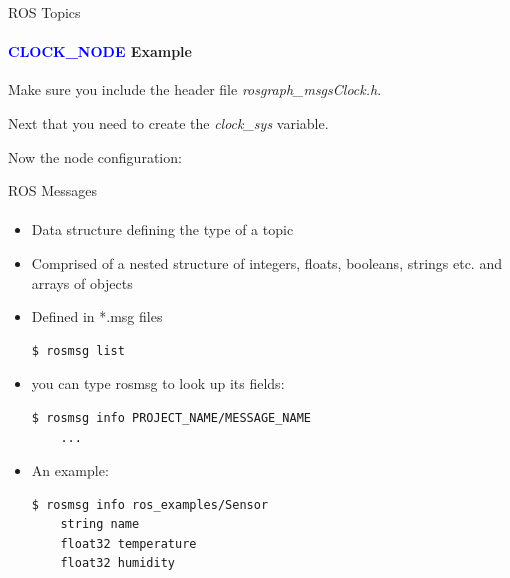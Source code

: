 \documentclass[aspectratio=169]{beamer}
\begin{document}
\begin{frame}[fragile]{ROS Topics}
	\framesubtitle{\textcolor{blue}{CLOCK\_NODE} Example}
	Make sure you include the header file  \textit{rosgraph\_msgs\/Clock.h}.
	
	Next that you need to create the \textit{clock\_sys} variable.
	
	Now the node configuration:
	

\end{frame}


\begin{frame}[fragile]{ROS Messages}
	\framesubtitle{ }
	\begin{minipage}{0.6\textwidth}
    \begin{itemize}
        \item Data structure defining the type of a topic
		\item Comprised of a nested structure of integers, floats, booleans, strings etc. and arrays of objects
		\item Defined in *.msg files
		\begin{lstlisting}[language=bash]
	$ rosmsg list
		\end{lstlisting}
		\item you can type rosmsg to look up its fields:
		\begin{lstlisting}[language=bash]
	$ rosmsg info PROJECT_NAME/MESSAGE_NAME
	...
		\end{lstlisting}

		\item An example:
		\begin{lstlisting}[language=bash]
	$ rosmsg info ros_examples/Sensor 
	string name
	float32 temperature
	float32 humidity	
		\end{lstlisting}

    \end{itemize}

\end{minipage}
\begin{minipage}{0.4\textwidth}
	
\end{minipage}
\end{frame}
\end{document}
